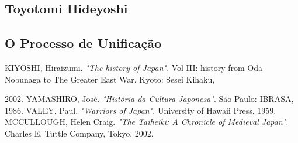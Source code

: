 \documentclass[12pt, a4paper]{article}
\begin{document}
        \subsection {Toyotomi Hideyoshi}
            
        \subsection {O Processo de Unificação}
            
    \newpage
    \begin{thebibliography}{9}
            \uppercase{kiyoshi}, Hiraizumi.
            \emph{"The history of Japan"}.
            Vol III: history from Oda Nobunaga to The Greater East War.
            Kyoto: Sesei Kihaku,

            2002.
            \uppercase{yamashiro}, José.
            \emph{"História da Cultura Japonesa"}.
            São Paulo: IBRASA,
            1986.
            \uppercase{valey}, Paul.
            \emph{"Warriors of Japan"}.
            University of Hawaii Press,
            1959.
            \uppercase{mccullough}, Helen Craig.
            \emph{"The Taiheiki: A Chronicle of Medieval Japan"}.
            Charles E. Tuttle Company, Tokyo,
            2002.
    \end{thebibliography}
\end{document}
